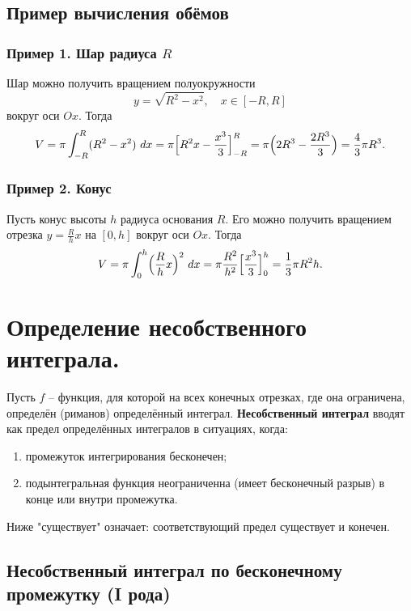 \documentclass[14pt]{extreport}
\begin{document}
    \section{Пример вычисления обёмов}
    \subsection{Пример 1. Шар радиуса $R$}
    Шар можно получить вращением полуокружности
    \[
    y = \sqrt{R^2 - x^2}, \quad x \in [-R, R]
    \]
    вокруг оси $Ox$. Тогда
    \[
    V = \pi \int_{-R}^R (R^2 - x^2)\ dx = \pi \Bigl[ R^2x - \frac{x^3}{3} \Bigr]_{-R}^R = \pi \Bigl( 2R^3 - \frac{2R^3}{3} \Bigr) = \frac{4}{3} \pi R^3.
    \]

    \subsection{Пример 2. Конус}
    Пусть конус высоты $h$ радиуса основания $R$. Его можно получить вращением отрезка $y = \frac{R}{h}x$ на $[0,h]$ вокруг оси $Ox$. Тогда
    \[
    V = \pi \int_0^h \Bigl( \frac{R}{h}x \Bigr)^2\ dx = \pi \frac{R^2}{h^2} \Bigl[ \frac{x^3}{3} \Bigr]_0^h = \frac{1}{3} \pi R^2h.
    \]



    \chapter{Определение несобственного интеграла.}

    \begin{definition}
        Пусть $f$ – функция, для которой на всех конечных отрезках, где она ограничена, определён (риманов) определённый интеграл. \textbf{Несобственный интеграл} вводят как предел определённых интегралов в ситуациях, когда:
        \begin{enumerate}
            \item промежуток интегрирования бесконечен;
            \item подынтегральная функция неограниченна (имеет бесконечный разрыв) в конце или внутри промежутка.
        \end{enumerate}
        Ниже "существует" означает: соответствующий предел существует и конечен.
    \end{definition}

    \section{Несобственный интеграл по бесконечному промежутку (I рода)}
\end{document}

